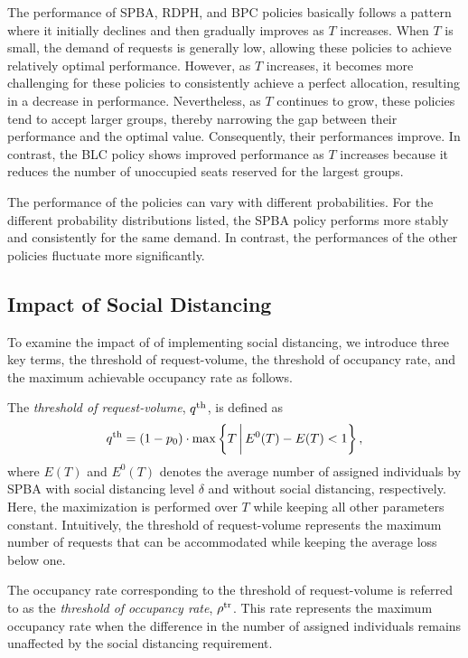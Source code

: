 The performance of SPBA, RDPH, and BPC policies basically follows a pattern where it initially declines and then gradually improves as $T$ increases. When $T$ is small, the demand of requests is generally low, allowing these policies to achieve relatively optimal performance. However, as $T$ increases, it becomes more challenging for these policies to consistently achieve a perfect allocation, resulting in a decrease in performance. Nevertheless, as $T$ continues to grow, these policies tend to accept larger groups, thereby narrowing the gap between their performance and the optimal value. Consequently, their performances improve. In contrast, the BLC policy shows improved performance as $T$ increases because it reduces the number of unoccupied seats reserved for the largest groups. 

The performance of the policies can vary with different probabilities. For the different probability distributions listed, the SPBA policy performs more stably and consistently for the same demand. In contrast, the performances of the other policies fluctuate more significantly.


\subsection{Impact of Social Distancing}\label{impact_sd}
To examine the impact of of implementing social distancing, we introduce three key terms, the threshold of request-volume, the threshold of occupancy rate, and the maximum achievable occupancy rate as follows.

The \textit{threshold of request-volume}, ${q}^{\textup{th}}$, is defined as 
\[
{q}^{\textup{th}} = (1- p_0) \cdot \max\left\{T \,\bigg|\, E^{0}(T) - E(T) < 1\right\},
\]
where $E(T)$ and $E^{0}(T)$ denotes the average number of assigned individuals by SPBA with social distancing level $\delta$ and without social distancing, respectively. Here, the maximization is performed over $T$ while keeping all other parameters constant.
Intuitively, the threshold of request-volume represents the maximum number of requests that can be accommodated while keeping the average loss below one.


The occupancy rate corresponding to the threshold of request-volume is referred to as the \textit{threshold of occupancy rate}, $\rho^{\textup{tr}}$. This rate represents the maximum occupancy rate when the difference in the number of assigned individuals remains unaffected by the social distancing requirement.

